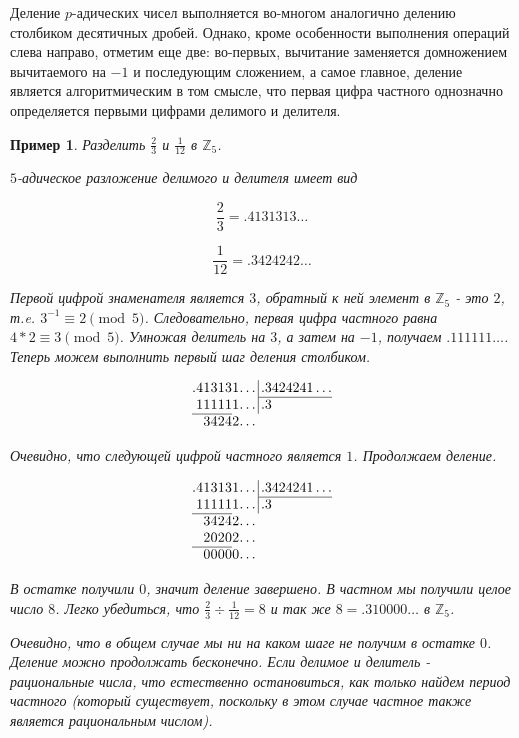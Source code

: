 \documentclass[master, och, diploma, times]{sty/SCWorks}
\theoremstyle{plain}
\newtheorem{exmp}{Пример}[section]
\theoremstyle{definition}
\numberwithin{equation}{section}
\begin{document}
Деление $p$-адических чисел выполняется во-многом аналогично делению столбиком десятичных дробей. Однако, кроме особенности выполнения операций слева направо, отметим еще две: во-первых, вычитание заменяется домножением вычитаемого на $-1$ и последующим сложением, а самое главное, деление является алгоритмическим в том смысле, что первая цифра частного однозначно определяется первыми цифрами делимого и делителя.

\begin{exmp}
Разделить $\frac{2}{3}$ и $\frac{1}{12}$ в $\mathbb{Z}_5$.

\noindent $5$-адическое разложение делимого и делителя имеет вид

$$
\frac{2}{3}=.4131313\dots
$$

$$
\frac{1}{12}=.3424242\dots
$$

\noindent Первой цифрой знаменателя является $3$, обратный к ней элемент в $\mathbb{Z}_5$ - это $2$, т.e. $3^{-1} \equiv 2 \pmod 5$. Следовательно, первая цифра частного равна \mbox{$4*2 \equiv 3 \pmod 5$}. Умножая делитель на $3$, а затем на $-1$, получаем $.111111\dots$. Теперь можем выполнить первый шаг деления столбиком.

$$
\arraycolsep=0.01em
\begin{array}{rrrrrrrr@{\,}r|l}
.&4&1&3&1&3&1&\dots&&\,.3424241\dots\\
\cline{10-10}
&1&1&1&1&1&1&\dots&&\,.3\\
\cline{1-6}
&&3&4&2&4&2&\dots
\end{array}
$$

\noindent Очевидно, что следующей цифрой частного является $1$. Продолжаем деление.

$$
\arraycolsep=0.01em
\begin{array}{rrrrrrrr@{\,}r|l}
.&4&1&3&1&3&1&\dots&&\,.3424241\dots\\
\cline{10-10}
&1&1&1&1&1&1&\dots&&\,.3\\
\cline{1-6}
&&3&4&2&4&2&\dots \\
&&2&0&2&0&2&\dots \\
\cline{1-6}
&&0&0&0&0&0&\dots
\end{array}
$$

\noindent В остатке получили $0$, значит деление завершено. В частном мы получили целое число $8$. Легко убедиться, что $\frac{2}{3} \div \frac{1}{12}=8$ и так же $8=.310000\dots$ в $\mathbb{Z}_5$.

Очевидно, что в общем случае мы ни на каком шаге не получим в остатке $0$. Деление можно продолжать бесконечно. Если делимое и делитель - рациональные числа, что естественно остановиться, как только найдем период частного (который существует, поскольку в этом случае частное также является рациональным числом).


\end{exmp}
\end{document}
